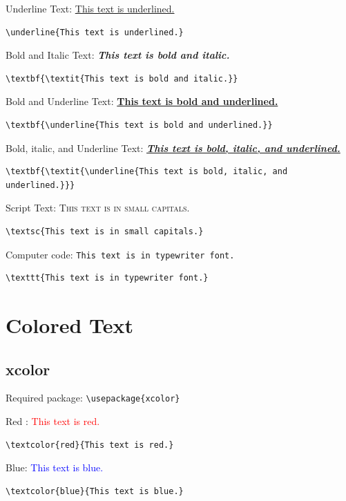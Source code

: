 \documentclass[12pt]{article}
\begin{document}
Underline Text: \underline{This text is underlined.}
\begin{verbatim}
\underline{This text is underlined.}
\end{verbatim}

Bold and Italic Text: \textbf{\textit{This text is bold and italic.}}
\begin{verbatim}
\textbf{\textit{This text is bold and italic.}}
\end{verbatim}

Bold and Underline Text: \textbf{\underline{This text is bold and underlined.}}
\begin{verbatim}
\textbf{\underline{This text is bold and underlined.}}
\end{verbatim}  

Bold, italic, and Underline Text: \textbf{\textit{\underline{This text is bold, italic, and underlined.}}}
\begin{verbatim}
\textbf{\textit{\underline{This text is bold, italic, and underlined.}}}
\end{verbatim}  

Script Text: \textsc{This text is in small capitals.}
\begin{verbatim}
\textsc{This text is in small capitals.}
\end{verbatim}

Computer code: \texttt{This text is in typewriter font.}
\begin{verbatim}
\texttt{This text is in typewriter font.}
\end{verbatim}





\section{Colored Text}

\subsection{xcolor}
Required package: \verb|\usepackage{xcolor}|

Red : \textcolor{red}{This text is red.}
\begin{verbatim}
\textcolor{red}{This text is red.}
\end{verbatim}

Blue: \textcolor{blue}{This text is blue.}
\begin{verbatim}    
\textcolor{blue}{This text is blue.}
\end{verbatim}
\end{document}
